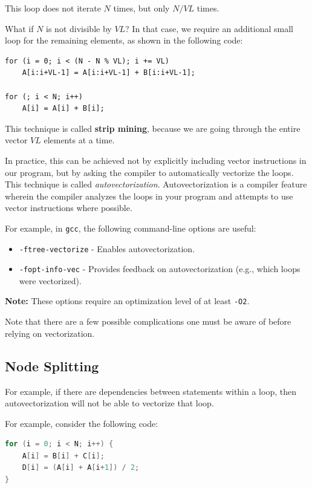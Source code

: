 \documentclass[12pt]{book}
\begin{document}
This loop does not iterate $N$ times, but only $N/VL$ times. 

What if $N$ is not divisible by $VL$? In that case, we require an additional small loop for the remaining elements, as shown in the following code:

\begin{lstlisting}
for (i = 0; i < (N - N % VL); i += VL)
    A[i:i+VL-1] = A[i:i+VL-1] + B[i:i+VL-1];

for (; i < N; i++)
    A[i] = A[i] + B[i];
\end{lstlisting}

This technique is called \textbf{strip mining}, because we are going through the entire vector $VL$ elements at a time.

In practice, this can be achieved not by explicitly including vector instructions in our program, but by asking the compiler to automatically vectorize the loops. This technique is called \textit{autovectorization}. Autovectorization is a compiler feature wherein the compiler analyzes the loops in your program and attempts to use vector instructions where possible.

For example, in \texttt{gcc}, the following command-line options are useful:
\begin{itemize}
    \item \texttt{-ftree-vectorize} - Enables autovectorization.
    \item \texttt{-fopt-info-vec} - Provides feedback on autovectorization (e.g., which loops were vectorized).
\end{itemize}

\noindent \textbf{Note:} These options require an optimization level of at least \texttt{-O2}.

Note that there are a few possible complications one must be aware of before relying on vectorization.

\subsection{Node Splitting}
For example, if there are dependencies between statements within a loop, then autovectorization will not be able to vectorize that loop.

For example, consider the following code:
\begin{lstlisting}[language=C]
for (i = 0; i < N; i++) {
    A[i] = B[i] + C[i];
    D[i] = (A[i] + A[i+1]) / 2;
}
\end{lstlisting}
\end{document}

